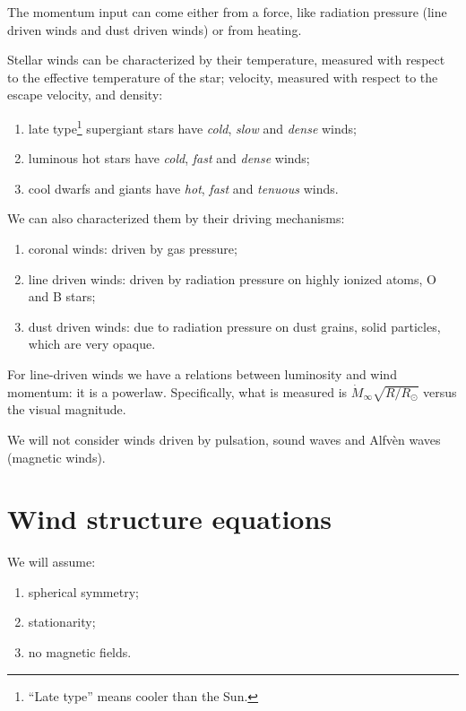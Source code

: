 \documentclass[main.tex]{subfiles}
\begin{document}

The momentum input can come either from a force, like radiation pressure (line driven winds and dust driven winds) or from heating.

Stellar winds can be characterized by their temperature, measured with respect to the effective temperature of the star; velocity, measured with respect to the escape velocity, and density: 
\begin{enumerate}
  \item late type\footnote{``Late type'' means cooler than the Sun.} supergiant stars have \emph{cold},  \emph{slow} and \emph{dense} winds;
  \item luminous hot stars have \emph{cold}, \emph{fast} and \emph{dense} winds;
  \item cool dwarfs and giants have \emph{hot}, \emph{fast} and \emph{tenuous} winds.
\end{enumerate}

We can also characterized them by their driving mechanisms:
\begin{enumerate}
    \item coronal winds: driven by gas pressure;
    \item line driven winds: driven by radiation pressure on highly ionized atoms, O and B stars;
    \item dust driven winds: due to radiation pressure on dust grains, solid particles, which are very opaque.
\end{enumerate}

For line-driven winds we have a relations between luminosity and wind momentum: it is a powerlaw. 
Specifically, what is measured is \(\dot{M}_{ \infty } \sqrt{R / R_{\odot}}\) versus the visual magnitude. 

We will not consider winds driven by pulsation, sound waves and Alfvèn waves (magnetic winds).

\section{Wind structure equations}

We will assume:
\begin{enumerate}
    \item spherical symmetry;
    \item stationarity;
    \item no magnetic fields.
\end{enumerate}
\end{document}
